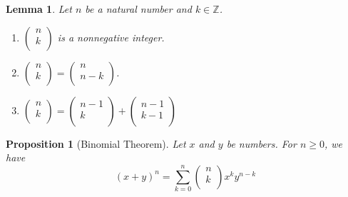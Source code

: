 \documentclass[12pt]{article}
\newtheorem{proposition}{Proposition}[subsection]
\newtheorem{lemma}{Lemma}[subsection]
\begin{document}
    \begin{lemma}
        Let $n$ be a natural number and $k \in \mathbb{Z}$.
        \begin{enumerate}
            \item $\left(\begin{array}{c} n\\k\\\end{array}\right)$ is a nonnegative integer.
            \item $\left(\begin{array}{c} n\\k\\\end{array}\right) = \left(\begin{array}{c} n\\n-k\\\end{array}\right)$.
            \item $\left(\begin{array}{c} n\\k\\\end{array}\right) = \left(\begin{array}{c} n-1\\k\\\end{array}\right) + \left(\begin{array}{c} n-1\\k-1\\\end{array}\right)$ 
        \end{enumerate}

    \end{lemma}
    \begin{proposition}[Binomial Theorem]
        Let $x$ and $y$ be numbers. For $n \geq 0$, we have
        \begin{equation}
            (x+y)^n = \sum^n_{k=0}\left(\begin{array}{c} n\\k\\\end{array}\right)x^ky^{n-k}
        \end{equation}

    \end{proposition}
\end{document}
